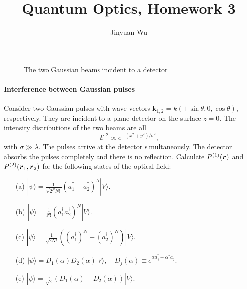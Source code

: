 \documentclass[hyperref, a4paper]{article}
\title{Quantum Optics, Homework 3}
\author{Jinyuan Wu}
\begin{document}
\maketitle

\begin{figure}
    \centering
    
    \caption{The two Gaussian beams incident to a detector}
\end{figure}

\paragraph{Interference between Gaussian pulses} Consider two Gaussian pulses with wave vectors
$\boldsymbol{k}_{1,2}=k(\pm \sin \theta, 0, \cos \theta)$, respectively.
They are incident to a plane detector on the surface $z=0$. 
The intensity distributions of the two beams are all 
\begin{equation}
    |\mathcal{E}|^{2} \propto e^{-\left(x^{2}+y^{2}\right) / \sigma^{2}},
\end{equation} 
with $\sigma \gg \lambda$. The pulses arrive at the detector simultaneously.
The detector absorbs the pulses completely and there is no reflection.
Calculate $P^{(1)}(\vb*{r})$ and $P^{(2)}(\vb*{r}_1, \vb*{r}_2)$ for the following states of the optical field: 
\begin{itemize}
    \item[(a)] $|\psi\rangle=\frac{1}{\sqrt{2^{N} N !}}\left(a_{1}^\dagger+a_{2}^\dagger\right)^{N}|V\rangle$.
    \item[(b)] $|\psi\rangle=\frac{1}{N !}\left(a_{1}^\dagger a_{2}^\dagger\right)^{N}|V\rangle$.
    \item[(c)] $|\psi\rangle=\frac{1}{\sqrt{2 N !}}\left(\left(a_{1}^\dagger\right)^{N}+\left(a_{2}^\dagger\right)^{N}\right)|V\rangle$.
    \item[(d)] $|\psi\rangle=D_{1}(\alpha) D_{2}(\alpha)|V\rangle, \quad D_{j}(\alpha) \equiv e^{\alpha a_{j}^\dagger-\alpha^{*} a_{j}}$.
    \item[(e)] $|\psi\rangle=\frac{1}{\sqrt{2}}\left(D_{1}(\alpha)+D_{2}(\alpha)\right)|V\rangle$.
\end{itemize}
\end{document}

